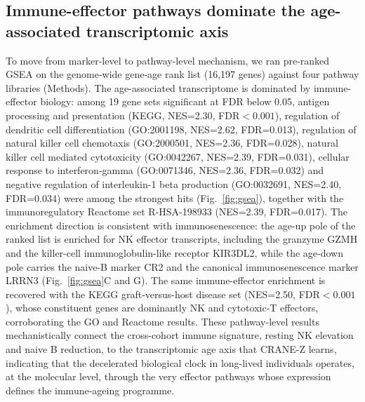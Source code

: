 \documentclass[unnumsec,webpdf,contemporary,large]{oup-authoring-template}
\begin{document}
\subsection{Immune-effector pathways dominate the age-associated transcriptomic axis}\label{sec:res7}
To move from marker-level to pathway-level mechanism, we ran pre-ranked GSEA on the genome-wide gene-age rank list (16,197 genes) against four pathway libraries (Methods). The age-associated transcriptome is dominated by immune-effector biology: among 19 gene sets significant at FDR below 0.05, antigen processing and presentation (KEGG, NES=2.30, FDR$<0.001$), regulation of dendritic cell differentiation (GO:2001198, NES=2.62, FDR=0.013), regulation of natural killer cell chemotaxis (GO:2000501, NES=2.36, FDR=0.028), natural killer cell mediated cytotoxicity (GO:0042267, NES=2.39, FDR=0.031), cellular response to interferon-gamma (GO:0071346, NES=2.36, FDR=0.032) and negative regulation of interleukin-1 beta production (GO:0032691, NES=2.40, FDR=0.034) were among the strongest hits (Fig.~\ref{fig:gsea}), together with the immunoregulatory Reactome set R-HSA-198933 (NES=2.39, FDR=0.017). The enrichment direction is consistent with immunosenescence: the age-up pole of the ranked list is enriched for NK effector transcripts, including the granzyme GZMH and the killer-cell immunoglobulin-like receptor KIR3DL2, while the age-down pole carries the naive-B marker CR2 and the canonical immunosenescence marker LRRN3 (Fig.~\ref{fig:gsea}C and G). The same immune-effector enrichment is recovered with the KEGG graft-versus-host disease set (NES=2.50, FDR$<0.001$), whose constituent genes are dominantly NK and cytotoxic-T effectors, corroborating the GO and Reactome results. These pathway-level results mechanistically connect the cross-cohort immune signature, resting NK elevation and naive B reduction, to the transcriptomic age axis that CRANE-Z learns, indicating that the decelerated biological clock in long-lived individuals operates, at the molecular level, through the very effector pathways whose expression defines the immune-ageing programme.
\end{document}
